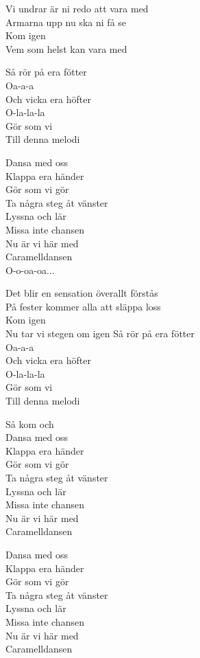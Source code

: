 \vspace{10pt}
Vi undrar är ni redo att vara med\\
Armarna upp nu ska ni få se\\
Kom igen\\
Vem som helst kan vara med\par
\vspace{10pt}
Så rör på era fötter\\
Oa-a-a\\
Och vicka era höfter\\
O-la-la-la\\
Gör som vi\\
Till denna melodi\par
\vspace{10pt}
Dansa med oss\\
Klappa era händer\\
Gör som vi gör\\
Ta några steg åt vänster\\
Lyssna och lär\\
Missa inte chansen\\
Nu är vi här med\\
Caramelldansen\\
O-o-oa-oa...\par
\vspace{10pt}
Det blir en sensation överallt förstås\\
På fester kommer alla att släppa loss\\
Kom igen\\
Nu tar vi stegen om igen
\newpage
Så rör på era fötter\\
Oa-a-a\\
Och vicka era höfter\\
O-la-la-la\\
Gör som vi\\
Till denna melodi\par
\vspace{10pt}
\revrpt Så kom och\\
Dansa med oss\\
Klappa era händer\\
Gör som vi gör\\
Ta några steg åt vänster\\
Lyssna och lär\\
Missa inte chansen\\
Nu är vi här med\\
Caramelldansen\par
\vspace{10pt}
Dansa med oss\\
Klappa era händer\\
Gör som vi gör\\
Ta några steg åt vänster\\
Lyssna och lär\\
Missa inte chansen\\
Nu är vi här med\\
Caramelldansen\rpt

